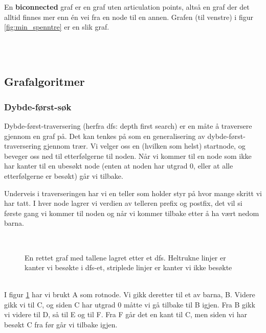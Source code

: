 En \textbf{biconnected} graf er en graf uten articulation points, altså en graf der det alltid finnes mer enn én vei fra en node til en annen. Grafen (til venstre) i figur \ref{fig:min_spenntre} er en slik graf. 

~\\~\\\subsection{Grafalgoritmer}

\subsubsection{Dybde-først-søk}
\label{dfs}
Dybde-først-traversering (herfra dfs: depth first search) er en måte å traversere gjennom en graf på. Det kan tenkes på som en generalisering av dybde-først-traversering gjennom trær. Vi velger oss en (hvilken som helst) startnode, og beveger oss ned til etterfølgerne til noden. Når vi kommer til en node som ikke har kanter til en ubesøkt node (enten at noden har utgrad 0, eller at alle etterfølgerne er besøkt) går vi tilbake. 

Underveis i traverseringen har vi en teller som holder styr på hvor mange skritt vi har tatt. I hver node lagrer vi verdien av telleren prefix og postfix, det vil si første gang vi kommer til noden og når vi kommer tilbake etter å ha vært nedom barna. 
~\\
\begin{figure}[H]
\centering
\captionsetup{justification=centering,margin=1cm}
\caption{En rettet graf med tallene lagret etter et dfs. Heltrukne linjer er kanter vi besøkte i dfs-et, striplede linjer er kanter vi ikke besøkte}~\\
\label{fig:dfs}
\end{figure}
~\\
I figur \ref{fig:dfs} har vi brukt A som rotnode. Vi gikk deretter til et av barna, B. Videre gikk vi til C, og siden C har utgrad 0 måtte vi gå tilbake til B igjen. Fra B gikk vi videre til D, så til E og til F. Fra F går det en kant til C, men siden vi har besøkt C fra før går vi tilbake igjen. 

